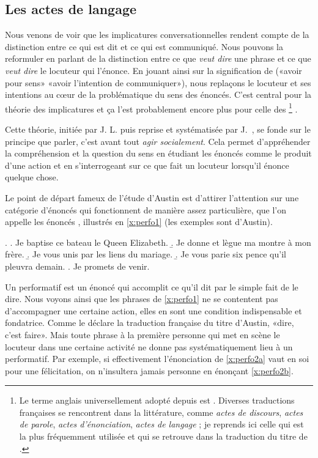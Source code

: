 \begin{refsegment}
\subsection{Les actes de langage}
\label{s:spacts}

Nous venons de voir que les implicatures conversationnelles rendent compte de la distinction entre ce qui est dit et ce qui est communiqué.  Nous pouvons la reformuler en parlant de la distinction entre ce que \emph{veut dire} une phrase et ce que \emph{veut dire} le locuteur qui l'énonce. 
En jouant ainsi sur la signification de  ({«avoir pour sens»} {\vs} «avoir l'intention de communiquer»),  nous replaçons le locuteur et ses intentions au c\oe ur de la problématique du sens des énoncés. 
C'est central pour la théorie des implicatures et ça l'est probablement encore plus pour celle des %
\footnote{Le terme anglais universellement adopté depuis \citet{Aus:65Frb} est . Diverses traductions françaises se rencontrent dans la littérature, comme \emph{actes de discours}, \emph{actes de parole}, \emph{actes d'énonciation},  \emph{actes de langage} ; je reprends ici celle qui est la plus fréquemment utilisée et qui se retrouve dans la traduction du titre de \citet{Sea:69Frb}.}%
.

Cette théorie, initiée par J. L. \citet{Aus:65Frb} puis reprise et systématisée par J.~\citet{Sea:69Frb}, se fonde sur le principe que parler, c'est avant tout \emph{agir socialement}.  Cela permet d'appréhender la compréhension et la question du sens en étudiant les énoncés comme le produit d'une action et en s'interrogeant sur ce que fait un locuteur lorsqu'il énonce quelque chose.

Le point de départ fameux de l'étude d'Austin est d'attirer l'attention sur une catégorie d'énoncés qui  fonctionnent de manière assez particulière, que l'on appelle les énoncés , illustrés en \ref{x:perfo1} (les exemples sont d'Austin).

\ex. \label{x:perfo1}
\a. Je baptise ce bateau le Queen Elizabeth.
\b. Je donne et lègue ma montre à mon frère.
\b. Je vous unis par les liens du mariage.
\b. Je vous parie six pence qu'il pleuvra demain.
\e. Je promets de venir.


Un performatif est un énoncé qui accomplit ce qu'il dit par le simple fait de le dire.  Nous voyons ainsi que les phrases de \ref{x:perfo1} ne se contentent pas d'accompagner une certaine action, elles en sont une condition indispensable et fondatrice.   Comme le déclare la traduction française du titre d'Austin, «dire, c'est faire».  Mais toute phrase à la première personne qui met en scène le locuteur dans une certaine activité ne donne pas systématiquement lieu à un performatif.  Par exemple, si effectivement l'énonciation de \ref{x:perfo2a} vaut en soi pour une félicitation, on n'insultera jamais personne en énonçant \ref{x:perfo2b}.


\end{refsegment}
